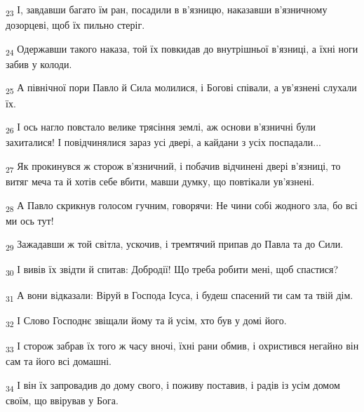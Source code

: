 \begin{tcolorbox}
\textsubscript{23} І, завдавши багато їм ран, посадили в в'язницю, наказавши в'язничному дозорцеві, щоб їх пильно стеріг.
\end{tcolorbox}
\begin{tcolorbox}
\textsubscript{24} Одержавши такого наказа, той їх повкидав до внутрішньої в'язниці, а їхні ноги забив у колоди.
\end{tcolorbox}
\begin{tcolorbox}
\textsubscript{25} А північної пори Павло й Сила молилися, і Богові співали, а ув'язнені слухали їх.
\end{tcolorbox}
\begin{tcolorbox}
\textsubscript{26} І ось нагло повстало велике трясіння землі, аж основи в'язничні були захиталися! І повідчинялися зараз усі двері, а кайдани з усіх поспадали...
\end{tcolorbox}
\begin{tcolorbox}
\textsubscript{27} Як прокинувся ж сторож в'язничний, і побачив відчинені двері в'язниці, то витяг меча та й хотів себе вбити, мавши думку, що повтікали ув'язнені.
\end{tcolorbox}
\begin{tcolorbox}
\textsubscript{28} А Павло скрикнув голосом гучним, говорячи: Не чини собі жодного зла, бо всі ми ось тут!
\end{tcolorbox}
\begin{tcolorbox}
\textsubscript{29} Зажадавши ж той світла, ускочив, і тремтячий припав до Павла та до Сили.
\end{tcolorbox}
\begin{tcolorbox}
\textsubscript{30} І вивів їх звідти й спитав: Добродії! Що треба робити мені, щоб спастися?
\end{tcolorbox}
\begin{tcolorbox}
\textsubscript{31} А вони відказали: Віруй в Господа Ісуса, і будеш спасений ти сам та твій дім.
\end{tcolorbox}
\begin{tcolorbox}
\textsubscript{32} І Слово Господнє звіщали йому та й усім, хто був у домі його.
\end{tcolorbox}
\begin{tcolorbox}
\textsubscript{33} І сторож забрав їх того ж часу вночі, їхні рани обмив, і охристився негайно він сам та його всі домашні.
\end{tcolorbox}
\begin{tcolorbox}
\textsubscript{34} І він їх запровадив до дому свого, і поживу поставив, і радів із усім домом своїм, що ввірував у Бога.
\end{tcolorbox}
